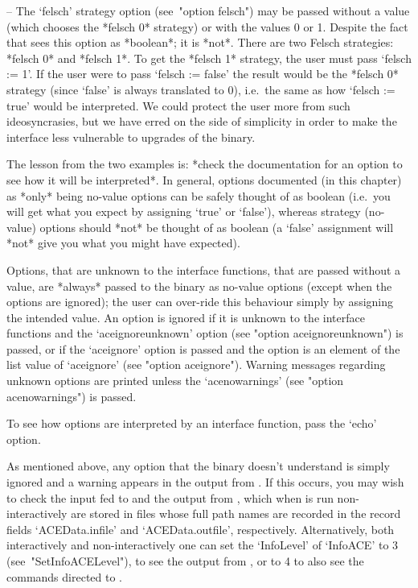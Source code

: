 \item{--} The `felsch' strategy option (see~"option  felsch")  may  be
passed without a value (which chooses the *felsch 0* strategy) or with
the values 0 or 1. Despite the fact that {\GAP} sees  this  option  as
*boolean*; it is *not*. There are two Felsch  strategies:  *felsch  0*
and *felsch 1*. To get the *felsch 1* strategy,  the  user  must  pass
`felsch := 1'. If the user were to pass `felsch := false'  the  result
would be the *felsch 0* strategy (since `false' is  always  translated
to 0), i.e.~the same as how `felsch := true' would be interpreted.  We
could protect the user more from  such  ideosyncrasies,  but  we  have
erred on the side of simplicity in order to make  the  interface  less
vulnerable to upgrades of the {\ACE} binary.

\endlist

The lesson from the two examples is: *check the documentation  for  an
option to see  how  it  will  be  interpreted*.  In  general,  options
documented (in this chapter) as *only* being no-value options  can  be
safely thought of as boolean (i.e.~you will get  what  you  expect  by
assigning `true' or  `false'),  whereas  strategy  (no-value)  options
should *not* be thought of as boolean (a `false' assignment will *not*
give you what you might have expected).

Options, that are unknown to the {\ACE} interface functions, that  are
passed without a value, are *always* passed to the  {\ACE}  binary  as
no-value options (except when the options are ignored); the  user  can
over-ride this behaviour simply by assigning the  intended  value.  An
option is ignored if it is unknown to the {\ACE}  interface  functions
and the `aceignoreunknown' option (see "option  aceignoreunknown")  is
passed, or if the `aceignore' option is passed and the  option  is  an
element of the list value of  `aceignore'  (see  "option  aceignore").
Warning messages regarding unknown  options  are  printed  unless  the
`acenowarnings' (see "option acenowarnings") is passed.

To see how options are interpreted by an  {\ACE}  interface  function,
pass the `echo' option.

As  mentioned  above,  any  option  that  the  {\ACE}  binary  doesn't
understand is simply ignored and a warning appears in the output  from
{\ACE}. If this occurs, you may wish to check the input fed to  {\ACE}
and the output from {\ACE}, which when {\ACE} is run non-interactively
are stored in files whose full path names are recorded in  the  record
fields   `ACEData.infile'   and    `ACEData.outfile',    respectively.
Alternatively, both interactively and non-interactively  one  can  set
the `InfoLevel' of `InfoACE' to 3 (see~"SetInfoACELevel"), to see  the
output from {\ACE}, or to 4 to  also  see  the  commands  directed  to
{\ACE}.

